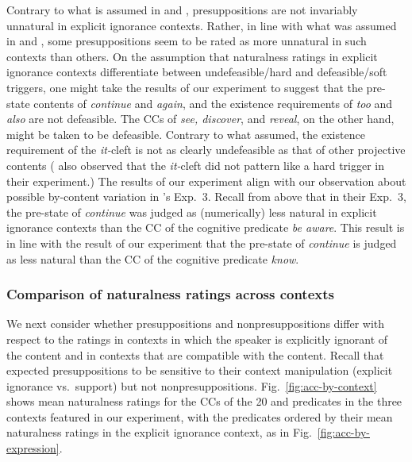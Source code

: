 \documentclass[11pt,fleqn]{article}
\newcommand{\6}{\mbox{$[\hspace*{-.6mm}[$}}
\newcommand{\9}{\mbox{$]\hspace*{-.6mm}]$}}
\newcommand{\citepos}[1]{\citeauthor{#1}'s \citeyear{#1}}
\begin{document}
Contrary to what is assumed in \citealt{mandelkern-etal2020} and \citealt{kalomoiros-schwarz2021}, presuppositions are not invariably unnatural in explicit ignorance contexts. Rather, in line with what was assumed in \citealt{simons01} and \citealt{abusch10}, some presuppositions seem to be rated as more unnatural in such contexts than others. On the assumption that naturalness ratings in explicit ignorance contexts differentiate between undefeasible/hard and defeasible/soft triggers, one might take the results of our experiment to suggest that the pre-state contents of {\em continue} and {\em again}, and the existence requirements of {\em too} and {\em also} are not defeasible. The CCs of {\em see, discover}, and {\em reveal}, on the other hand, might be taken to be defeasible. Contrary to what \citealt{abusch10} assumed, the existence requirement of the {\em it-}cleft is not as clearly undefeasible as that of other projective contents (\citealt{smith-hall11} also observed that the {\em it-}cleft did not pattern like a hard trigger in their experiment.) The results of our experiment align with our observation about possible by-content variation in \citepos{mandelkern-etal2020} Exp.~3. Recall from above that in their Exp.~3, the pre-state of {\em continue} was judged as (numerically) less natural in explicit ignorance contexts than the CC of the cognitive predicate {\em be aware}. This result is in line with the result of our experiment that the pre-state of {\em continue} is judged as less natural than the CC of the cognitive predicate {\em know}.

\subsubsection{Comparison of naturalness ratings across contexts}\label{s:analysis2}

We next consider whether presuppositions and nonpresuppositions differ with respect to the ratings in contexts in which the speaker is explicitly ignorant of the content and in contexts that are compatible with the content. Recall that \citealt{mandelkern-etal2020} expected presuppositions to be sensitive to their context manipulation (explicit ignorance vs.\ support) but not nonpresuppositions. Fig.~\ref{fig:acc-by-context} shows mean naturalness ratings for the CCs of the 20  and  predicates in the three contexts featured in our experiment, with the predicates ordered by their mean naturalness ratings in the explicit ignorance context, as in Fig.~\ref{fig:acc-by-expression}. 
\end{document}
